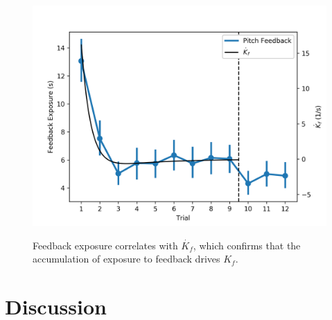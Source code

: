 \begin{figure}[t]
    \centering
    \centering
    \includegraphics[width=0.8\linewidth]{figures/Modeling/f_v_kfd.png}
    \label{fig:feedback_kfd}
    \caption[Feedback exposure correlates with $\dot{K_f}$]{Feedback exposure correlates with $\dot{K_f}$, which confirms that the accumulation of exposure to feedback drives $K_f$.}
\end{figure}

\section{Discussion}
